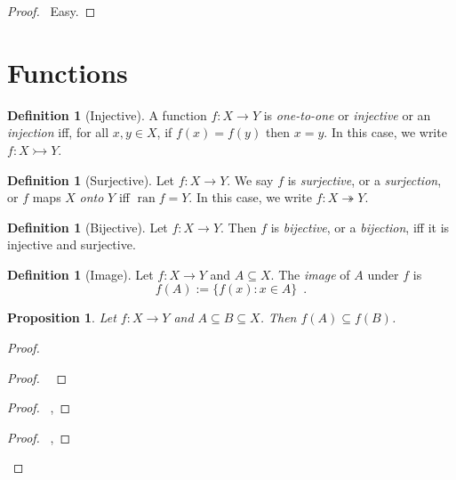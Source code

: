 \documentclass{report}
\let\qed\relax
\newtheorem{prop}[ax]{Proposition}
\theoremstyle{definition}
\newtheorem{df}[ax]{Definition}
\newcommand{\ran}{\ensuremath{\operatorname{ran}}}
\begin{document}
\begin{proof}
\pf\ Easy. \qed
\end{proof}

\section{Functions}

\begin{df}[Injective]
A function $f : X \rightarrow Y$ is \emph{one-to-one} or 	\emph{injective} or an \emph{injection} iff, for all $x,y \in X$, if $f(x) = f(y)$ then $x = y$. In this case, we write $f : X \rightarrowtail Y$.
\end{df}

\begin{df}[Surjective]
Let $f : X \rightarrow Y$. We say $f$ is \emph{surjective}, or a \emph{surjection}, or $f$ maps $X$ \emph{onto} $Y$ iff $\ran f = Y$. In this case, we write $f : X \twoheadrightarrow Y$.
\end{df}

\begin{df}[Bijective]
Let $f : X \rightarrow Y$. Then $f$ is \emph{bijective}, or a \emph{bijection}, iff it is injective and surjective.
\end{df}

\begin{df}[Image]
Let $f : X \rightarrow Y$ and $A \subseteq X$. The \emph{image} of $A$ under $f$ is
\[ f(A) := \{ f(x) : x \in A \} \enspace . \]
\end{df}

\begin{prop}
Let $f : X \rightarrow Y$ and $A \subseteq B \subseteq X$. Then $f(A) \subseteq f(B)$.
\end{prop}

\begin{proof}
\pf
{}
\begin{proof}
	\pf\ 
\end{proof}
\begin{proof}
	\pf\ , 
\end{proof}
\begin{proof}
	\pf\ , 
\end{proof}
\qed
\end{proof}
\end{document}
